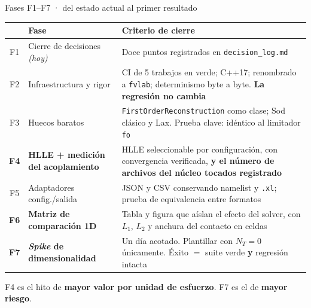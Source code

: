 \documentclass[aspectratio=169,10pt]{beamer}
\newcommand{\cod}[1]{\texttt{\small #1}}
\begin{document}
\begin{frame}[shrink]{Fases F1--F7 · del estado actual al primer resultado}
  \centering\scriptsize
  \begin{tabular}{@{}clp{58mm}@{}}
    \toprule
    & \textbf{Fase} & \textbf{Criterio de cierre} \\
    \midrule
    F1 & Cierre de decisiones \emph{(hoy)} & Doce puntos registrados en \cod{decision\_log.md} \\
    \midrule
    F2 & Infraestructura y rigor & CI de 5 trabajos en verde; C++17; renombrado a \cod{fvlab}; determinismo byte a byte. \textbf{La regresión no cambia} \\
    \midrule
    F3 & Huecos baratos & \cod{FirstOrderReconstruction} como clase; Sod clásico y Lax. Prueba clave: idéntico al limitador \cod{fo} \\
    \midrule
    \textbf{F4} & \textbf{HLLE + medición del acoplamiento} & HLLE seleccionable por configuración, con convergencia verificada, \textbf{y el número de archivos del núcleo tocados registrado} \\
    \midrule
    F5 & Adaptadores config./salida & JSON y CSV conservando namelist y \cod{.xl}; prueba de equivalencia entre formatos \\
    \midrule
    \textbf{F6} & \textbf{Matriz de comparación 1D} & Tabla y figura que aíslan el efecto del solver, con $L_1$, $L_2$ y anchura del contacto en celdas \\
    \midrule
    \textbf{F7} & \textbf{\emph{Spike} de dimensionalidad} & Un día acotado. Plantillar con $N_T=0$ únicamente. Éxito $=$ suite verde \textbf{y} regresión intacta \\
    \bottomrule
  \end{tabular}

  \vspace{0.4em}
  {\scriptsize F4 es el hito de \textbf{mayor valor por unidad de esfuerzo}.
   F7 es el de \textbf{mayor riesgo}.}
\end{frame}
\end{document}
